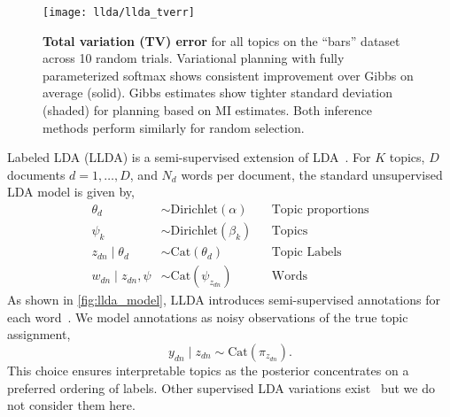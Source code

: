 \begin{figure}[t]
  \centering
  \hspace{-4mm}\texttt{[image: llda/llda\_tverr]} 
  
  \caption{\small\textbf{Total variation (TV) error} for all topics on
    the ``bars'' dataset across 10 random trials.  Variational
    planning with fully parameterized softmax shows consistent
    improvement over Gibbs on average (solid).  Gibbs estimates show
    tighter standard deviation (shaded) for planning based on MI
    estimates.  Both inference methods perform similarly for random
    selection.}
  
  \label{fig:llda_tv}
\end{figure}

  

Labeled LDA (LLDA) is a semi-supervised extension of
LDA~\citep{blei2003latent}.  For $K$ topics, $D$ documents
$d=1,\ldots,D$, and $N_d$ words per document, the standard
unsupervised LDA model is given by,
\begin{align*}
  \theta_d &\sim \text{Dirichlet}(\alpha) && \text{Topic proportions}\\
  \psi_k &\sim \text{Dirichlet}(\beta_k) && \text{Topics}\\
  z_{dn} \mid \theta_d &\sim \text{Cat}(\theta_d) && \text{Topic Labels}\\
  w_{dn} \mid z_{dn}, \psi &\sim \text{Cat}(\psi_{z_{dn}}) && \text{Words}
\end{align*}
As shown in \FIG\ref{fig:llda_model}, LLDA introduces semi-supervised
annotations for each word~\citep{flaherty2005latent}.  We model
annotations as noisy observations of the true topic assignment,
\[
  y_{dn} \mid z_{dn} \sim \text{Cat}(\pi_{z_{dn}}).
\]
This choice ensures interpretable topics as the posterior concentrates
on a preferred ordering of labels.  Other supervised LDA variations
exist~\citep{ramage2009labeled} but we do not consider them here.

